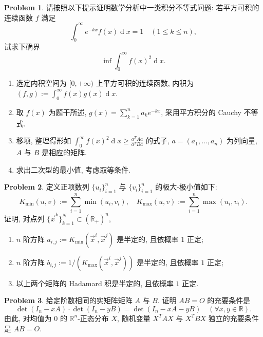 \documentclass{MainStyle}
\theoremstyle{definition}
\newtheorem{problem}{Problem}
\begin{document}
\begin{problem}
请按照以下提示证明数学分析中一类积分不等式问题: 若平方可积的连续函数 $f$ 满足
\begin{equation}
    \int_0^\infty e^{-kx}f(x)\operatorname dx=1\quad (1\leq k\leq n),
\end{equation}
试求下确界
\begin{equation}
    \inf\int_0^\infty f(x)^2\operatorname dx.
\end{equation}
\begin{enumerate}
    \item 选定内积空间为 $[0,+\infty)$ 上平方可积的连续函数, 内积为 $(f,g):=\int_0^\infty f(x)g(x)\operatorname dx$.
    \item 取 $f(x)$ 为题干所述, $g(x)=\sum_{k=1}^n a_k e^{-kx}$, 采用平方积分的 Cauchy 不等式.
    \item 移项, 整理得形如 $\int_0^\infty f(x)^2\operatorname dx\geq \frac{a^T Aa}{a^T Ba}$ 的式子, $a=(a_1,\ldots, a_n)$ 为列向量, $A$ 与 $B$ 是相应的矩阵.
    \item 求出二次型的最小值, 考虑取等条件.
\end{enumerate}
\end{problem}

\begin{problem}
定义正项数列 $\{u_i\}_{i=1}^n$ 与 $\{v_i\}_{i=1}^n$ 的极大-极小值如下:
\begin{equation}
    K_{\min}(u,v):=\sum_{i=1}^n\min(u_i,v_i),\quad K_{\max}(u,v):=\sum_{i=1}^n\max(u_i,v_i).
\end{equation}
证明, 对点列 $\{\vec x^k\}_{k=1}^N\subset (\mathbb R_+)^n$,
\begin{enumerate}
    \item $n$ 阶方阵 $a_{i,j}:=K_{\min}(\vec x^i,\vec x^j)$ 是半定的, 且依概率 $1$ 正定;
    \item $n$ 阶方阵 $b_{i,j}:=1/(K_{\max}(\vec x^i,\vec x^j))$ 是半定的, 且依概率 $1$ 正定;
    \item 以上两个矩阵的 Hadamard 积是半定的, 且依概率 $1$ 正定.
\end{enumerate}
\end{problem}

\begin{problem}
给定阶数相同的实矩阵矩阵 $A$ 与 $B$. 证明 $AB=O$ 的充要条件是
\begin{equation}
    \det (I_n-xA)\cdot \det (I_n-yB)=\det (I_n-xA-yB)\quad (\forall x,y\in \mathbb R).
\end{equation}
由此, 对均值为 $0$ 的 $\mathbb R^n$-正态分布 $X$, 随机变量 $X^TAX$ 与 $X^TBX$ 独立的充要条件是 $AB=O$.
\end{problem}
\end{document}

